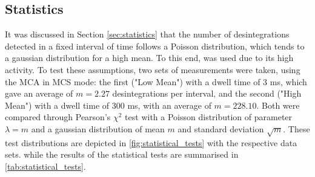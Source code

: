 \subsection{Statistics}
It was discussed in Section \ref{sec:statistics} that the number of desintegrations detected 
in a fixed interval of time follows a Poisson distribution, which tends to 
a gaussian distribution for a high mean.
To this end, \cesium was used due to its high activity.
To test these assumptions, two sets of measurements were taken, using the MCA in MCS mode: 
the first ("Low Mean") with a dwell time of $3$ ms, which gave an average of $m = 2.27$ desintegrations per interval, 
and the second ("High Mean") with a dwell time of $300$ ms, with an average of $m = 228.10$.
Both were compared through Pearson's $\chi^2$ test 
with a Poisson distribution of parameter $\lambda = m$ 
and a gaussian distribution of mean $m$ and standard deviation $\sqrt{m}$.
These test distributions are depicted in \autoref{fig:statistical_tests} with
the respective data sets.
while the results of the statistical tests are summarised in \autoref{tab:statistical_tests}.
%
